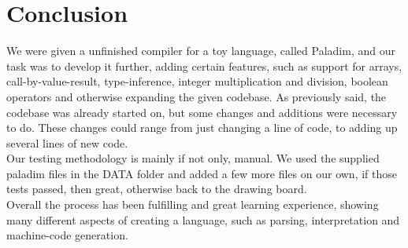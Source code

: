 \section{Conclusion}
We were given a unfinished compiler for a toy language, called Paladim, and our task was to
develop it further, adding certain features, such as support for arrays,
call-by-value-result, type-inference, integer multiplication and division,
boolean operators and otherwise expanding the given codebase. As previously said,
the codebase was already started on, but some changes and additions were
necessary to do.
These changes could range from just changing a line of code, to adding up
several lines of new code.\\
Our testing methodology is mainly if not only, manual. We used the supplied
paladim files in the DATA folder and added a few more files on our own, if those
tests passed, then great, otherwise back to the drawing board.\\
Overall the process has been fulfilling and great learning experience, showing
many different aspects of creating a language, such as parsing, interpretation
and machine-code generation.\\

